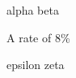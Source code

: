 \begin{outer}%
alpha   beta %
\begin{inner}%
A   rate   of   8\% %
\end{inner}%

epsilon   zeta
\end{outer}%
